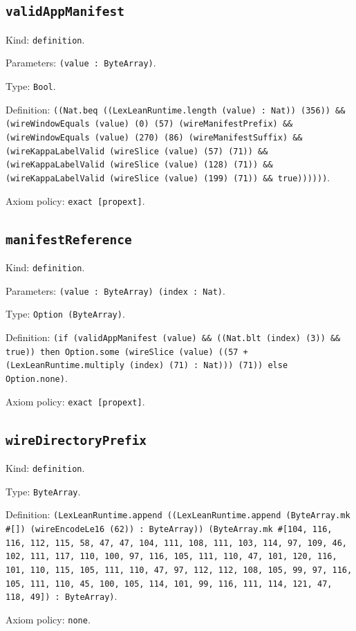 \documentclass[11pt]{article}
\begin{document}
\subsection*{\texttt{validAppManifest}}
\noindent Kind: \texttt{definition}.\par
\noindent Parameters: \texttt{(value : ByteArray)}.\par
\noindent Type: \texttt{Bool}.\par
\noindent Definition: \texttt{((Nat.beq ((LexLeanRuntime.length (value) : Nat)) (356)) \&\& (wireWindowEquals (value) (0) (57) (wireManifestPrefix) \&\& (wireWindowEquals (value) (270) (86) (wireManifestSuffix) \&\& (wireKappaLabelValid (wireSlice (value) (57) (71)) \&\& (wireKappaLabelValid (wireSlice (value) (128) (71)) \&\& (wireKappaLabelValid (wireSlice (value) (199) (71)) \&\& true))))))}.\par
\noindent Axiom policy: \texttt{exact [propext]}.\par
\subsection*{\texttt{manifestReference}}
\noindent Kind: \texttt{definition}.\par
\noindent Parameters: \texttt{(value : ByteArray) (index : Nat)}.\par
\noindent Type: \texttt{Option (ByteArray)}.\par
\noindent Definition: \texttt{(if (validAppManifest (value) \&\& ((Nat.blt (index) (3)) \&\& true)) then Option.some (wireSlice (value) ((57 + (LexLeanRuntime.multiply (index) (71) : Nat))) (71)) else Option.none)}.\par
\noindent Axiom policy: \texttt{exact [propext]}.\par
\subsection*{\texttt{wireDirectoryPrefix}}
\noindent Kind: \texttt{definition}.\par
\noindent Type: \texttt{ByteArray}.\par
\noindent Definition: \texttt{(LexLeanRuntime.append ((LexLeanRuntime.append (ByteArray.mk \#[]) (wireEncodeLe16 (62)) : ByteArray)) (ByteArray.mk \#[104, 116, 116, 112, 115, 58, 47, 47, 104, 111, 108, 111, 103, 114, 97, 109, 46, 102, 111, 117, 110, 100, 97, 116, 105, 111, 110, 47, 101, 120, 116, 101, 110, 115, 105, 111, 110, 47, 97, 112, 112, 108, 105, 99, 97, 116, 105, 111, 110, 45, 100, 105, 114, 101, 99, 116, 111, 114, 121, 47, 118, 49]) : ByteArray)}.\par
\noindent Axiom policy: \texttt{none}.\par
\end{document}
